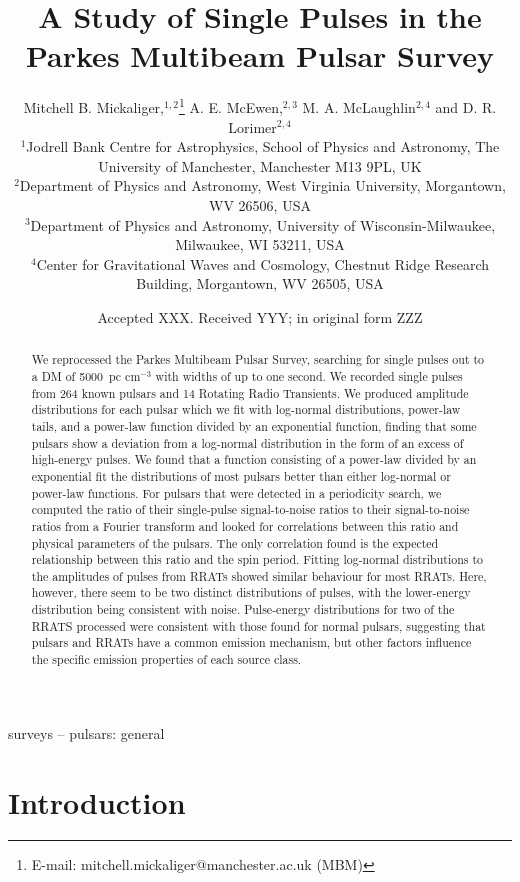 \documentclass[fleqn,usenatbib]{mnras}
\title[A Study of Single Pulses in the Parkes Multibeam Pulsar Survey]{A Study of Single Pulses in the Parkes Multibeam Pulsar Survey}
\author[M. B. Mickaliger et al.]{
Mitchell B. Mickaliger,$^{1,2}$\thanks{E-mail: mitchell.mickaliger@manchester.ac.uk (MBM)}
A. E. McEwen,$^{2,3}$
M. A. McLaughlin$^{2,4}$ and
D. R. Lorimer$^{2,4}$
\\
$^{1}$Jodrell Bank Centre for Astrophysics, School of Physics and Astronomy, The University of Manchester, Manchester M13 9PL, UK\\
$^{2}$Department of Physics and Astronomy, West Virginia University, Morgantown, WV 26506, USA\\
$^{3}$Department of Physics and Astronomy, University of Wisconsin-Milwaukee, Milwaukee, WI 53211, USA\\
$^{4}$Center for Gravitational Waves and Cosmology, Chestnut Ridge Research Building, Morgantown, WV 26505, USA\\
}
\date{Accepted XXX. Received YYY; in original form ZZZ}
\begin{document}
\label{firstpage}
\pagerange{\pageref{firstpage}--\pageref{lastpage}}
\maketitle

\begin{abstract}
We reprocessed the Parkes Multibeam Pulsar Survey, searching for single pulses out to a DM of 5000~pc cm$^{-3}$ with widths of up to one second. We recorded single pulses from 264 known pulsars and
14 Rotating Radio Transients. We produced amplitude distributions for each pulsar which we fit with log-normal distributions, power-law tails, and a power-law function divided by an exponential function, finding that some pulsars show a deviation from a log-normal distribution in the form of an excess of high-energy pulses. We found that a function consisting of a power-law divided by an exponential fit the distributions of most pulsars better than either log-normal or power-law functions. For pulsars that were detected in a periodicity search, we computed the ratio of their single-pulse signal-to-noise ratios to their signal-to-noise ratios from a Fourier transform and looked for correlations between this ratio and physical parameters of the pulsars. The only correlation found is the expected relationship between this ratio and the spin period. Fitting log-normal distributions to the amplitudes of pulses from RRATs showed similar behaviour for most RRATs. Here, however, there seem to be two distinct distributions of pulses, with the lower-energy distribution being consistent with noise. Pulse-energy distributions for two of the RRATS processed were consistent with those found for normal pulsars, suggesting that pulsars and RRATs have a common emission mechanism, but other factors influence the specific emission properties of each source class.
\end{abstract}

\begin{keywords}
surveys -- pulsars: general
\end{keywords}



\section{Introduction}
\label{intro}
\end{document}
